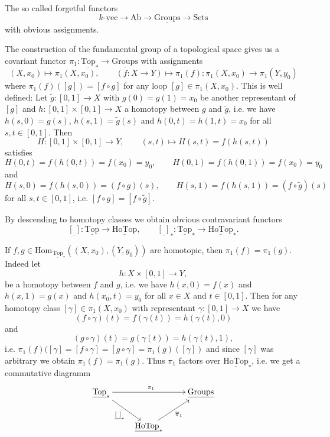 \documentclass[11pt]{book}
\numberwithin{dummy}{section}
\theoremstyle{nonumberbreak}
\newenvironment{defin}[1][]{\ifthenelse{\equal{#1}{}}{\definition}{\definition[#1]}\rm}{\enddefinition}
\newenvironment{ex}[1][]{\ifthenelse{\equal{#1}{}}{\example}{\example[#1]}\rm}{\endexample}
\newcommand{\Hom}{\mathrm{Hom}\hspace{1pt}}
\newcommand{\sets}{\underline{\mathrm{Sets}}}
\newcommand{\Ab}{\underline{\mathrm{Ab}}}
\newcommand{\kvec}{\underline{k\textrm{-}\mathrm{vec}}}
\newcommand{\grp}{\underline{\mathrm{Groups}}}
\newcommand{\topsp}{\underline{\mathrm{Top}}}
\newcommand{\topstar}{\underline{\mathrm{Top}}_*}
\newcommand{\hotop}{\underline{\mathrm{HoTop}}}
\newcommand{\hotopstar}{\underline{\mathrm{HoTop}}_{*}}
\newcommand{\la}{\longrightarrow}
\begin{document}
\begin{spacing}{1.4}
\begin{defin}
\begin{compactenum}
\end{compactenum}
\end{defin}



\begin{ex}   %
\begin{compactenum}

\item The so called forgetful functors
$$\kvec \la \Ab \la \grp \la \sets $$
with obvious assignments.
\item The construction of the fundamental group of a topological space gives us a covariant functor
$\pi_1: \topstar \la \grp$ with assignments 
$$(X,x_0) \mapsto \pi_1(X,x_0), \qquad (f:X \la Y) \mapsto \pi_1(f): \pi_1(X,x_0) \la \pi_1(Y,y_0)$$
where $\pi_1(f)([g]) = [f \circ g]$ for any loop $[g] \in \pi_1(X,x_0)$. This is well defined: Let $\tilde{g}:[0,1] \la X$ with $g(0)=g(1)=x_0$ be another representant of $[g]$ and $h: [0,1] \times [0,1]  \la X$ a homotopy between $g$ and $\tilde{g}$, i.e. we have $h(s,0)=g(s)$, $h(s,1)=\tilde{g}(s)$ and $h(0,t) = h(1,t)= x_0$ for all $s,t \in [0,1]$. Then 
$$H:[0,1] \times [0,1] \la Y, \qquad (s,t) \mapsto H(s,t) = f(h(s,t))$$
satisfies $$H(0,t)=f(h(0,t))=f(x_0)=y_0, \qquad H(0,1)=f(h(0,1))=f(x_0)=y_0$$ and $$H(s,0) = f(h(s,0))=(f\circ g)(s), \qquad  H(s,1)=f(h(s,1))=(f \circ \tilde{g})(s)$$ for all $s,t \in [0,1]$, i.e. $[f \circ g] = [f \circ \tilde{g}]$.



\item By descending to homotopy classes we obtain obvious contravariant functors
$$\underline{[\ ]}: \topsp \la \hotop, \qquad \underline{[\ ]}_{*}: \topstar \la \hotopstar.$$
\item If $f,g \in \Hom_{\topstar}((X,x_0),(Y,y_0))$ are homotopic, then $\pi_1(f) = \pi_1(g)$. Indeed let $$h: X \times [0,1] \la Y,$$
be a homotopy between $f$ and $g$, i.e. we have $h(x,0) = f(x)$ and $h(x,1) = g(x)$ and $h(x_0,t)=y_0$ for all $x \in X$ and $t \in [0,1]$. Then for any homotopy class $[\gamma] \in \pi_1(X,x_0)$ with representant $\gamma: [0,1] \la X$ we have
$$(f \circ \gamma)(t) = f(\gamma(t)) = h(\gamma(t),0)$$
and
$$(g \circ \gamma)(t) = g(\gamma(t)) = h(\gamma(t),1),$$
i.e. $\pi_1(f)([\gamma]=[f \circ \gamma] = [g \circ \gamma] = \pi_1(g)([\gamma])$ and since $[\gamma]$ was arbitrary we obtain $\pi_1(f) = \pi_1(g)$.
Thus $\pi_1$ factors over $\hotopstar$, i.e. we get a commutative diagramm
$$
\begin{xy}
\xymatrix{
\topstar \ar[rr]^{\pi_1}  \ar[rd]_{\underline{[\ ]}_{*}} && \grp \\ & \hotopstar \ar[ru]_{\overline{\pi}_1} &
}
\end{xy}
$$


\end{compactenum}
\end{ex}
\end{spacing}
\end{document}
